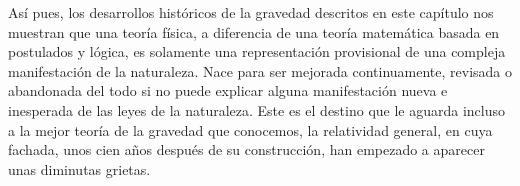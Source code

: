 Así pues, los desarrollos históricos de la gravedad descritos en este capítulo
nos muestran que una teoría física, a diferencia de una teoría matemática basada
en postulados y lógica, es solamente una representación provisional de una compleja
manifestación de la naturaleza. Nace para ser mejorada continuamente, revisada o
abandonada del todo si no puede explicar alguna manifestación nueva e inesperada
de las leyes de la naturaleza. Este es el destino que le aguarda incluso a la
mejor teoría de la gravedad que conocemos, la relatividad general,
en cuya fachada, unos cien años después de su construcción, han empezado a aparecer
unas diminutas grietas.
